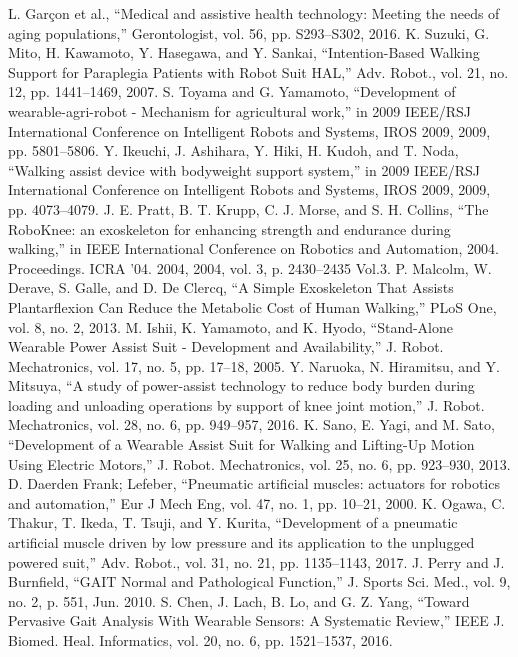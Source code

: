 \documentclass[paper,JRM,paper]{jaciiiarticle}
\begin{document}
\begin{thebibliography}{99}

	L. Garçon et al., “Medical and assistive health technology: Meeting the needs of aging populations,” Gerontologist, vol. 56, pp. S293–S302, 2016.
	K. Suzuki, G. Mito, H. Kawamoto, Y. Hasegawa, and Y. Sankai, “Intention-Based Walking Support for Paraplegia Patients with Robot Suit HAL,” Adv. Robot., vol. 21, no. 12, pp. 1441–1469, 2007.
	S. Toyama and G. Yamamoto, “Development of wearable-agri-robot - Mechanism for agricultural work,” in 2009 IEEE/RSJ International Conference on Intelligent Robots and Systems, IROS 2009, 2009, pp. 5801–5806.
	Y. Ikeuchi, J. Ashihara, Y. Hiki, H. Kudoh, and T. Noda, “Walking assist device with bodyweight support system,” in 2009 IEEE/RSJ International Conference on Intelligent Robots and Systems, IROS 2009, 2009, pp. 4073–4079.
	J. E. Pratt, B. T. Krupp, C. J. Morse, and S. H. Collins, “The RoboKnee: an exoskeleton for enhancing strength and endurance during walking,” in IEEE International Conference on Robotics and Automation, 2004. Proceedings. ICRA ’04. 2004, 2004, vol. 3, p. 2430–2435 Vol.3.
	P. Malcolm, W. Derave, S. Galle, and D. De Clercq, “A Simple Exoskeleton That Assists Plantarflexion Can Reduce the Metabolic Cost of Human Walking,” PLoS One, vol. 8, no. 2, 2013.
	M. Ishii, K. Yamamoto, and K. Hyodo, “Stand-Alone Wearable Power Assist Suit - Development and Availability,” J. Robot. Mechatronics, vol. 17, no. 5, pp. 17–18, 2005.
	Y. Naruoka, N. Hiramitsu, and Y. Mitsuya, “A study of power-assist technology to reduce body burden during loading and unloading operations by support of knee joint motion,” J. Robot. Mechatronics, vol. 28, no. 6, pp. 949–957, 2016.
	K. Sano, E. Yagi, and M. Sato, “Development of a Wearable Assist Suit for Walking and Lifting-Up Motion Using Electric Motors,” J. Robot. Mechatronics, vol. 25, no. 6, pp. 923–930, 2013.
	D. Daerden Frank; Lefeber, “Pneumatic artificial muscles: actuators for robotics and automation,” Eur J Mech Eng, vol. 47, no. 1, pp. 10–21, 2000.
	K. Ogawa, C. Thakur, T. Ikeda, T. Tsuji, and Y. Kurita, “Development of a pneumatic artificial muscle driven by low pressure and its application to the unplugged powered suit,” Adv. Robot., vol. 31, no. 21, pp. 1135–1143, 2017.
	J. Perry and J. Burnfield, “GAIT Normal and Pathological Function,” J. Sports Sci. Med., vol. 9, no. 2, p. 551, Jun. 2010.
	S. Chen, J. Lach, B. Lo, and G. Z. Yang, “Toward Pervasive Gait Analysis With Wearable Sensors: A Systematic Review,” IEEE J. Biomed. Heal. Informatics, vol. 20, no. 6, pp. 1521–1537, 2016.

\end{thebibliography}
\end{document}
